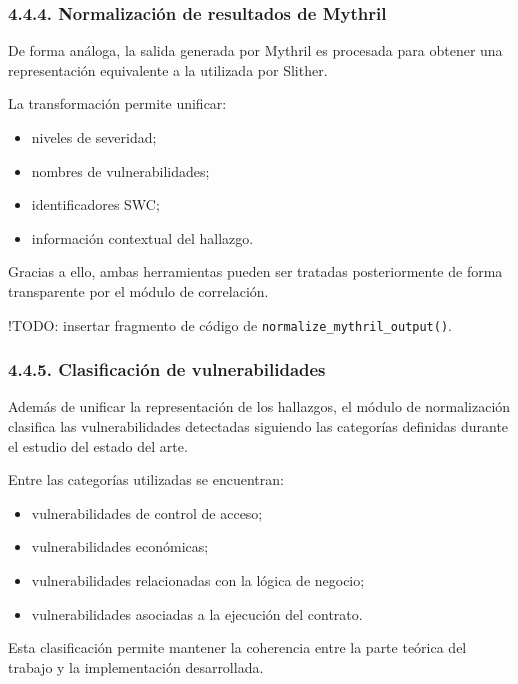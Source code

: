 \subsubsection{4.4.4. Normalización de resultados de
Mythril}\label{normalizaciuxf3n-de-resultados-de-mythril}

De forma análoga, la salida generada por Mythril es procesada para
obtener una representación equivalente a la utilizada por Slither.

La transformación permite unificar:

\begin{itemize}
\tightlist
\item
  niveles de severidad;
\item
  nombres de vulnerabilidades;
\item
  identificadores SWC;
\item
  información contextual del hallazgo.
\end{itemize}

Gracias a ello, ambas herramientas pueden ser tratadas posteriormente de
forma transparente por el módulo de correlación.

!TODO: insertar fragmento de código de
\texttt{normalize\_mythril\_output()}.

\subsubsection{4.4.5. Clasificación de
vulnerabilidades}\label{clasificaciuxf3n-de-vulnerabilidades}

Además de unificar la representación de los hallazgos, el módulo de
normalización clasifica las vulnerabilidades detectadas siguiendo las
categorías definidas durante el estudio del estado del arte.

Entre las categorías utilizadas se encuentran:

\begin{itemize}
\tightlist
\item
  vulnerabilidades de control de acceso;
\item
  vulnerabilidades económicas;
\item
  vulnerabilidades relacionadas con la lógica de negocio;
\item
  vulnerabilidades asociadas a la ejecución del contrato.
\end{itemize}

Esta clasificación permite mantener la coherencia entre la parte teórica
del trabajo y la implementación desarrollada.

